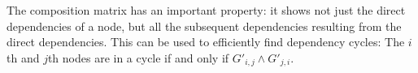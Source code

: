 \documentclass[12pt]{article}
\begin{document}
\begin{enumerate}
\begin{center}
\end{center}
    The composition matrix has an important property: it shows not just the
    direct dependencies of a node, but all the subsequent dependencies resulting
    from the direct dependencies. This can be used to efficiently find
    dependency cycles: The $i$th and $j$th nodes are in a cycle if and only if
    $G'_{i,j} \land G'_{j,i}$.


\end{enumerate}
\end{document}
